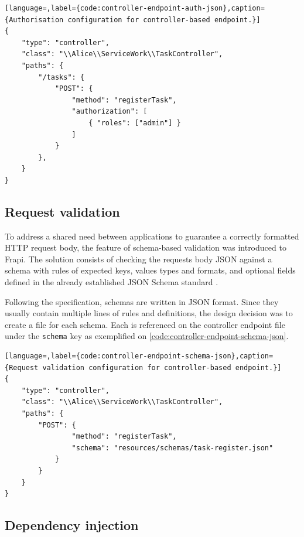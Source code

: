 \begin{lstlisting}[language=,label={code:controller-endpoint-auth-json},caption={Authorisation configuration for controller-based endpoint.}]
{
    "type": "controller",
    "class": "\\Alice\\ServiceWork\\TaskController",
    "paths": {
        "/tasks": {
            "POST": {
	            "method": "registerTask",
	            "authorization": [
                    { "roles": ["admin"] }
                ]
	        }
        },
    }
}
\end{lstlisting}

\subsection{Request validation}

To address a shared need between applications to guarantee a correctly formatted HTTP request body, the feature of schema-based validation was introduced to Frapi. The solution consists of checking the requests body JSON against a schema with rules of expected keys, values types and formats, and optional fields defined in the already established JSON Schema standard \cite{json-schema-spec}.

Following the specification, schemas are written in JSON format. Since they usually contain multiple lines of rules and definitions, the design decision was to create a file for each schema. Each is referenced on the controller endpoint file under the \texttt{schema} key as exemplified on \autoref{code:controller-endpoint-schema-json}.

\begin{lstlisting}[language=,label={code:controller-endpoint-schema-json},caption={Request validation configuration for controller-based endpoint.}]
{
	"type": "controller",
    "class": "\\Alice\\ServiceWork\\TaskController",
    "paths": {
		"POST": {
                "method": "registerTask",
                "schema": "resources/schemas/task-register.json"
            }
        }
    }
}
\end{lstlisting}

\subsection{Dependency injection}

